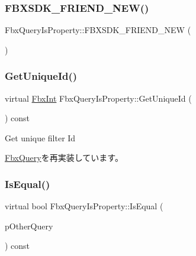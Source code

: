 \subsubsection{\texorpdfstring{F\+B\+X\+S\+D\+K\+\_\+\+F\+R\+I\+E\+N\+D\+\_\+\+N\+E\+W()}{FBXSDK\_FRIEND\_NEW()}}
{\footnotesize\ttfamily Fbx\+Query\+Is\+Property\+::\+F\+B\+X\+S\+D\+K\+\_\+\+F\+R\+I\+E\+N\+D\+\_\+\+N\+EW (\begin{DoxyParamCaption}{ }\end{DoxyParamCaption})}

\mbox{\label{class_fbx_query_is_property_a390fb64587424e7d16cb4966566aee80}} 
\subsubsection{\texorpdfstring{Get\+Unique\+Id()}{GetUniqueId()}}
{\footnotesize\ttfamily virtual \hyperlink{fbxtypes_8h_a088fa96de3b0b3ea69f0f6afef525dfb}{Fbx\+Int} Fbx\+Query\+Is\+Property\+::\+Get\+Unique\+Id (\begin{DoxyParamCaption}{ }\end{DoxyParamCaption}) const\hspace{0.3cm}{\ttfamily [virtual]}}



Get unique filter Id 



\hyperlink{class_fbx_query_ac7daae8f6fa83cd97ae24e93d7b4dc29}{Fbx\+Query}を再実装しています。

\mbox{\label{class_fbx_query_is_property_ace0b3dd62cc2614acc88ad892849416b}} 
\subsubsection{\texorpdfstring{Is\+Equal()}{IsEqual()}}
{\footnotesize\ttfamily virtual bool Fbx\+Query\+Is\+Property\+::\+Is\+Equal (\begin{DoxyParamCaption}\item[{\hyperlink{class_fbx_query}{Fbx\+Query} $\ast$}]{p\+Other\+Query }\end{DoxyParamCaption}) const\hspace{0.3cm}{\ttfamily [virtual]}}

